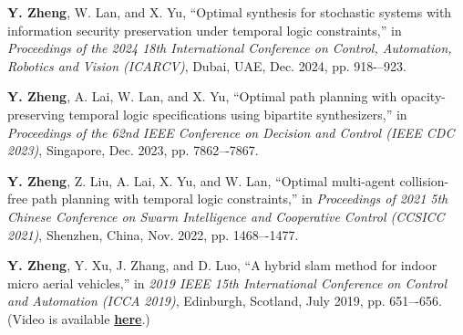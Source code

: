 \documentclass[11pt]{article}
\newcommand\doilink[1]{\href{http://dx.doi.org/#1}{#1}}
\newcommand\doi[1]{DOI:\doilink{#1}}
\begin{document}
\begin{bibenum}[itemsep=5pt, label=\textbf{[\arabic*] }]
    \item \textbf{Y. Zheng}, W. Lan, and X. Yu, 
    ``Optimal synthesis for stochastic systems
    with information security preservation under temporal logic constraints,''
    in \emph{Proceedings of the 2024 18th International Conference on Control, Automation, Robotics and Vision (ICARCV)},
    Dubai, UAE, Dec. 2024, pp. 918-–923.

    \item \textbf{Y. Zheng}, A. Lai, W. Lan, and X. Yu, 
    ``Optimal path planning with opacity-preserving temporal logic specifications using bipartite synthesizers,'' 
    in \emph{Proceedings of the 62nd IEEE Conference on Decision and Control (IEEE CDC 2023)}, Singapore, Dec. 2023, pp. 7862–-7867.
    
    \item \textbf{Y. Zheng}, Z. Liu, A. Lai, X. Yu, and W. Lan, 
    ``Optimal multi-agent collision-free path planning with temporal logic constraints,'' 
    in \emph{Proceedings of 2021 5th Chinese Conference on Swarm Intelligence and Cooperative Control (CCSICC 2021)}, %
    Shenzhen, China, Nov. 2022, pp. 1468–-1477.
    
    \item \textbf{Y. Zheng}, Y. Xu, J. Zhang, and D. Luo, 
    ``A hybrid slam method for indoor micro aerial vehicles,''
    in \emph{2019 IEEE 15th International Conference on Control and Automation (ICCA 2019)}, %
    Edinburgh, Scotland, July 2019, pp. 651–-656.
    (Video is available \href{https://www.youtube.com/playlist?list=PLWlDMqOM9D2R34O04VglkfJLh-Xs-Wbzt}{\textbf{here}}.)


\end{bibenum}


\end{document}

